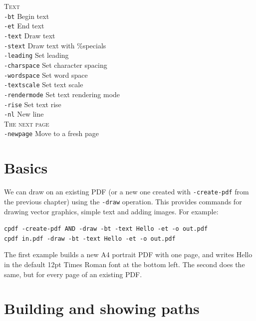 \documentclass{book}
\begin{document}
{\begin{framed}
   \vspace{1.5mm}
   \noindent \textsc{Text}\\
   \noindent\verb!-bt! Begin text\\
   \noindent\verb!-et! End text\\
   \noindent\verb!-text! Draw text\\
   \noindent\verb!-stext! Draw text with \%specials\\
   \noindent\verb!-leading! Set leading\\
   \noindent\verb!-charspace! Set character spacing\\
   \noindent\verb!-wordspace! Set word space\\
   \noindent\verb!-textscale! Set text scale\\
   \noindent\verb!-rendermode! Set text rendering mode\\
   \noindent\verb!-rise! Set text rise\\
   \noindent\verb!-nl! New line\\

   \vspace{1.5mm}
   \noindent \textsc{The next page}\\
   \noindent\verb!-newpage! Move to a fresh page



  \end{framed}}

\section{Basics}

We can draw on an existing PDF (or a new one created with \texttt{-create-pdf} from the previous chapter) using the \texttt{-draw} operation. This provides commands for drawing vector graphics, simple text and adding images. For example:

\begin{framed}
 \noindent\small\verb?cpdf -create-pdf AND -draw -bt -text Hello -et -o out.pdf?\\
 \noindent\small\verb?cpdf in.pdf -draw -bt -text Hello -et -o out.pdf?
\end{framed}

\noindent The first example builds a new A4 portrait PDF with one page, and writes Hello in the default 12pt Times Roman font at the bottom left. The second does the same, but for every page of an existing PDF.

\section{Building and showing paths}
\end{document}
